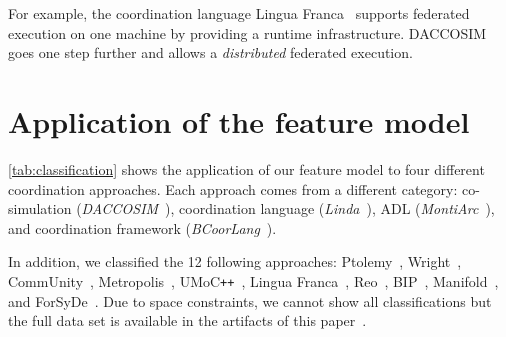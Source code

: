 \documentclass[runningheads]{llncs}
\begin{document}
For example, the coordination language Lingua Franca~\cite{lohstrohReactorsDeterministicModel2020} supports federated execution on one machine by providing a runtime infrastructure.
DACCOSIM~\cite{galtierFMIBasedDistributedMultisimulation2015} goes one step further and allows a \textit{distributed} federated execution.


\section{Application of the feature model} \label{sec: application}
\autoref{tab:classification} shows the application of our feature model to four different coordination approaches.
Each approach comes from a different category: co-simulation (\textit{DACCOSIM}~\cite{galtierFMIBasedDistributedMultisimulation2015,dadSynthesisFeedbackDistribution2021}), coordination language (\textit{Linda}~\cite{carrieroLindaContext1989,carrieroLindaAlternativeMessagepassing1994}), ADL (\textit{MontiArc}~\cite{haberMontiArcArchitecturalModeling2014}), and coordination framework (\textit{BCoorLang}~\cite{krauterBehavioralConsistencyHeterogeneous2021,krauterBehavioralConsistencyMultimodeling2023}).

In addition, we classified the 12 following approaches: Ptolemy~\cite{ekerTamingHeterogeneityPtolemy2003,ptolemaeusSystemDesignModeling2014}, Wright~\cite{allenFormalBasisArchitectural1997,allenFormalApproachSoftware1997}, CommUnity~\cite{fiadeiroSemanticsArchitecturalConnectors1997,oliveiraCommUnityWorkbench2007}, Metropolis~\cite{balarinMetropolisIntegratedElectronic2003}, UMoC\texttt{++}~\cite{mathaikuttyUMoCBasedMultiMoC2006}, Lingua Franca~\cite{lohstrohReactorsDeterministicModel2020,lohstrohLinguaFrancaDeterministic2021}, Reo~\cite{arbabReoChannelbasedCoordination2004}, BIP~\cite{bliudzeAlgebraConnectorsStructuring2008,basuRigorousComponentBasedSystem2011}, Manifold~\cite{arbabOverviewManifoldIts1993,papadopoulosModellingActivitiesInformation1998}, and ForSyDe~\cite{sanderSystemModelingTransformational2004,sanderForSyDeSystemDesign2016}.
Due to space constraints, we cannot show all classifications but the full data set is available in the artifacts of this paper~\cite{timkrauterArtifactsCoordination2024}.
\end{document}
